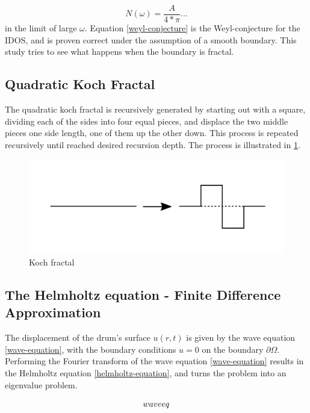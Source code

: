 \documentclass{article}
\begin{document}
\begin{equation}
    \label{weyl-conjecture}
    N(\omega) = \frac{A}{4*\pi}...
\end{equation}
in the limit of large $\omega$. Equation \ref{weyl-conjecture} is the Weyl-conjecture for the IDOS, and is proven correct under the assumption of a smooth boundary. This study tries to see what happens when the boundary is fractal.

\subsection{Quadratic Koch Fractal}\label{theory-koch}
The quadratic koch fractal is recursively generated by starting out with a square, dividing each of the sides into four equal pieces, and displace the two middle pieces one side length, one of them up the other down. This process is repeated recursively until reached desired recursion depth. The process is illustrated in \ref{generate-koch}.

\begin{figure}
    \includegraphics[width=\linewidth, trim={0 3cm 0 3cm}]{../figs/koch_frac_step.pdf}
    \caption{Koch fractal}
    \label{generate-koch}
\end{figure}

\subsection{The Helmholtz equation - Finite Difference Approximation}
The displacement of the drum's surface $u(r, t)$ is given by the wave equation \ref{wave-equation}, with the boundary conditions $u = 0$ on the boundary $\partial \Omega$. Performing the Fourier transform of the wave equation \ref{wave-equation} results in the Helmholtz equation \ref{helmholtz-equation}, and turns the problem into an eigenvalue problem.

\begin{equation}
    waveeq \\
\end{equation}
\end{document}
